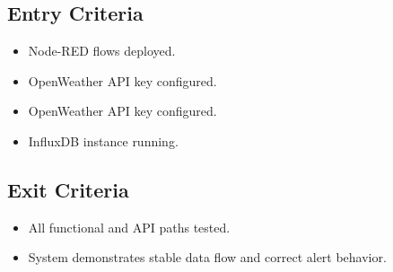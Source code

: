 \subsection{Entry Criteria}
\begin{itemize}
    \item Node-RED flows deployed.
    \item OpenWeather API key configured.
    \item OpenWeather API key configured.
    \item InfluxDB instance running.
\end{itemize}

\subsection{Exit Criteria}
\begin{itemize}
    \item All functional and API paths tested.
    \item System demonstrates stable data flow and correct alert behavior.
\end{itemize}

